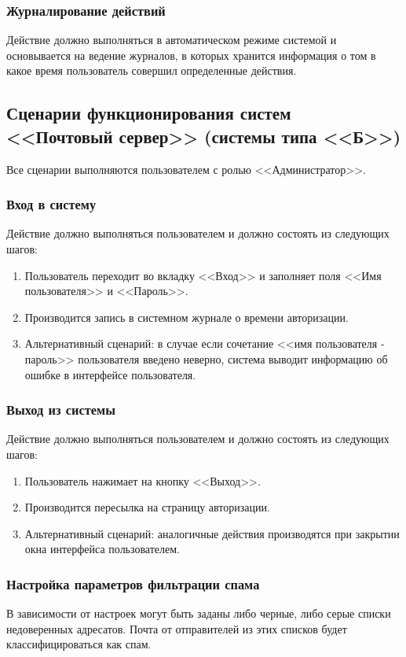 \subsubsection*{Журналирование действий}
Действие должно выполняться в автоматическом режиме системой и основывается на ведение журналов, в которых хранится информация о том в какое время пользователь совершил определенные действия.

\subsection{Сценарии функционирования систем <<Почтовый сервер>> (системы типа <<Б>>)}
Все сценарии выполняются пользователем с ролью <<Администратор>>.

\subsubsection*{Вход в систему}

Действие должно выполняться пользователем и должно состоять из следующих шагов:
\begin{enumerate}
  \item Пользователь переходит во вкладку <<Вход>> и заполняет поля <<Имя пользователя>> и <<Пароль>>.
  \item Производится запись в системном журнале о времени авторизации.
  \item Альтернативный сценарий: в случае если сочетание <<имя пользователя - пароль>> пользователя введено неверно, система выводит информацию об ошибке в интерфейсе пользователя.
\end{enumerate}

\subsubsection*{Выход из системы}
Действие должно выполняться пользователем и должно состоять из следующих шагов:
\begin{enumerate}
  \item Пользователь нажимает на кнопку <<Выход>>.
  \item Производится пересылка на страницу авторизации.
  \item Альтернативный сценарий: аналогичные действия производятся при закрытии окна интерфейса пользователем.
\end{enumerate}

\subsubsection*{Настройка параметров фильтрации спама}
В зависимости от настроек могут быть заданы либо черные, либо серые списки недоверенных адресатов. Почта от отправителей из этих списков будет классифицироваться как спам.


